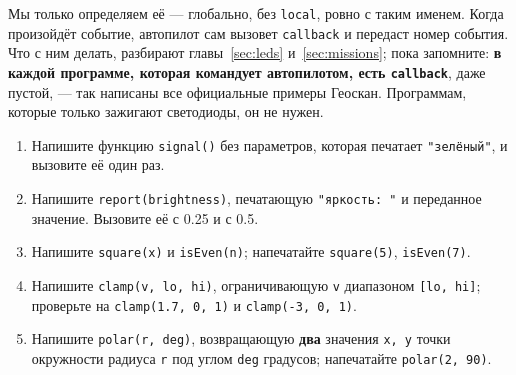 Мы только определяем её --- глобально, без \verb|local|, ровно с таким именем. Когда произойдёт событие, автопилот сам вызовет \verb|callback| и передаст номер события. Что с ним делать, разбирают главы~\ref{sec:leds} и~\ref{sec:missions}; пока запомните: \textbf{в каждой программе, которая командует автопилотом, есть \texttt{callback}}, даже пустой, --- так написаны все официальные примеры Геоскан. Программам, которые только зажигают светодиоды, он не нужен.

\begin{taskbox}
\begin{enumerate}
  \item Напишите функцию \verb|signal()| без параметров, которая печатает \verb|"зелёный"|, и вызовите её один раз.
  \item Напишите \verb|report(brightness)|, печатающую \verb|"яркость: "| и переданное значение. Вызовите её с 0.25 и с 0.5.
  \item Напишите \verb|square(x)| и \verb|isEven(n)|; напечатайте \verb|square(5)|, \verb|isEven(7)|.
  \item Напишите \verb|clamp(v, lo, hi)|, ограничивающую \verb|v| диапазоном \verb|[lo, hi]|; проверьте на \verb|clamp(1.7, 0, 1)| и \verb|clamp(-3, 0, 1)|.
  \item Напишите \verb|polar(r, deg)|, возвращающую \textbf{два} значения \verb|x, y| точки окружности радиуса \verb|r| под углом \verb|deg| градусов; напечатайте \verb|polar(2, 90)|.
\end{enumerate}
\end{taskbox}
